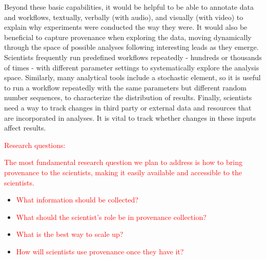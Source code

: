 \documentclass[10pt]{article}
\newcommand{\todo}[1]{\textcolor{red}{#1}}
\begin{document}
Beyond these basic capabilities, it would be helpful to be able to
annotate data and workflows, textually, verbally (with audio), and
visually (with video) to explain why experiments were conducted
the way they were.
It would also be beneficial to capture provenance
when exploring the data,
moving dynamically through the space of possible analyses following
interesting leads as they emerge. Scientists frequently run predefined
workflows repeatedly - hundreds or thousands of times - with different
parameter settings to systematically explore the analysis space.
Similarly, many analytical tools include a stochastic element, so it
is useful to run a workflow repeatedly with the same parameters but different
random number sequences, to characterize the
distribution of results.
Finally, scientists need a way to track changes in third party
or external data and resources that are incorporated in analyses.
It is vital to track whether changes in these inputs affect results.

\todo{Research questions:}

\todo{The most fundamental research question we plan to address is how to bring provenance 
to the scientists, making it easily available and accessible to the scientists.  }

\begin{itemize}
\item \todo{What information should be collected?}
\item \todo{What should the scientist's role be in provenance collection?}
\item \todo{What is the best way to scale up?}
\item \todo{How will scientists use provenance once they have it?}
\end{itemize}
\end{document}
